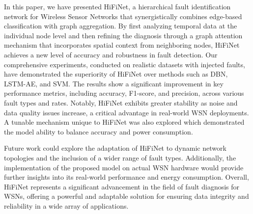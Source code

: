 In this paper, we have presented HiFiNet, a hierarchical fault identification network for Wireless Sensor Networks that synergistically combines edge-based classification with graph aggregation. By first analyzing temporal data at the individual node level and then refining the diagnosis through a graph attention mechanism that incorporates spatial context from neighboring nodes, HiFiNet achieves a new level of accuracy and robustness in fault detection. Our comprehensive experiments, conducted on realistic datasets with injected faults, have demonstrated the superiority of HiFiNet over methods such as DBN, LSTM-AE, and SVM. The results show a significant improvement in key performance metrics, including accuracy, F1-score, and precision, across various fault types and rates. Notably, HiFiNet exhibits greater stability as noise and data quality issues increase, a critical advantage in real-world WSN deployments. A tunable mechanism unique to HiFiNet was also explored which demonstrated the model ability to balance accuracy and power consumption.

Future work could explore the adaptation of HiFiNet to dynamic network topologies and the inclusion of a wider range of fault types. Additionally, the implementation of the proposed model on actual WSN hardware would provide further insights into its real-world performance and energy consumption. Overall, HiFiNet represents a significant advancement in the field of fault diagnosis for WSNs, offering a powerful and adaptable solution for ensuring data integrity and reliability in a wide array of applications.
